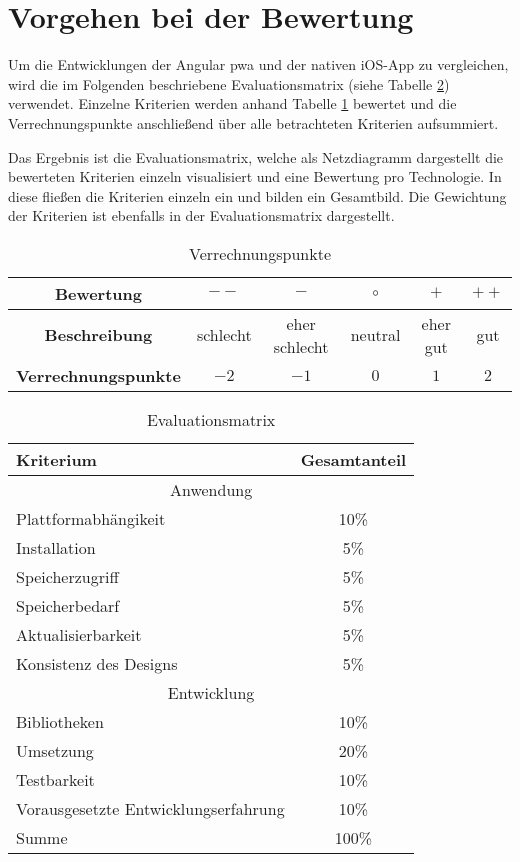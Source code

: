 \section{Vorgehen bei der Bewertung}
Um die Entwicklungen der Angular \ac{pwa} und der nativen iOS-App zu vergleichen, wird die im Folgenden beschriebene Evaluationsmatrix (siehe Tabelle \ref{tab:punktekatalog}) verwendet. Einzelne Kriterien werden anhand Tabelle \ref{tab:verrechnungspunkte} bewertet und die Verrechnungspunkte anschließend über alle betrachteten Kriterien aufsummiert.

Das Ergebnis ist die Evaluationsmatrix, welche als Netzdiagramm dargestellt die bewerteten Kriterien einzeln visualisiert und eine Bewertung pro Technologie. In diese fließen die Kriterien einzeln ein und bilden ein Gesamtbild. Die Gewichtung der Kriterien ist ebenfalls in der Evaluationsmatrix dargestellt.
\begin{table}[h]
	\centering
	\begin{tabular}{|c|c|c|c|c|c|}
		\hline 	
			\textbf{Bewertung} & $--$ & $-$ &  $\circ$ & $+$ & $++$ \\ 
		\hline 
			\textbf{Beschreibung} & schlecht & eher schlecht & neutral & eher gut & gut \\ 
		\hline 
			\textbf{Verrechnungspunkte} & $-2$ & $-1$ & $0$ & $1$ & $2$ \\ 
		\hline 		
	\end{tabular} 
	\caption{Verrechnungspunkte} \label{tab:verrechnungspunkte}
\end{table}

\begin{table}[h]
	\centering
	\begin{tabular}{|l|c|}
		\hline
		Kriterium              & Gesamtanteil \\
		\hline
		\multicolumn{2}{c}{Anwendung}     \\
		\hline
		Plattformabhängikeit   & 10\%         \\
		Installation           & 5\%          \\
		Speicherzugriff        & 5\%          \\
		Speicherbedarf         & 5\%          \\
		Aktualisierbarkeit     & 5\%          \\
		Konsistenz des Designs & 5\%         \\
		
		\hline
		\multicolumn{2}{c}{Entwicklung}     \\
		\hline
		Bibliotheken           & 10\%         \\
		Umsetzung              & 20\%         \\
		Testbarkeit            & 10\%         \\
		Vorausgesetzte Entwicklungserfahrung    & 10\%         \\
		\hline
		\hline
		Summe                  & 100\%        \\
		\hline
	\end{tabular}
	\caption{Evaluationsmatrix} \label{tab:punktekatalog}
\end{table}

